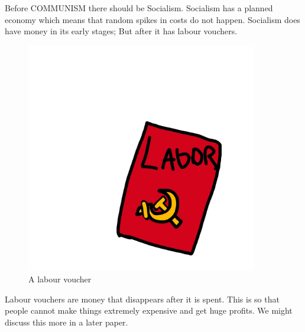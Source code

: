 \documentclass[a4paper]{book} %
\begin{document}
  Before COMMUNISM there should be Socialism. Socialism has a planned economy which means that random spikes in costs do not happen. Socialism does have money in its early stages; But after it has labour vouchers. 

\begin{figure}[tbhp]
\centering
\includegraphics[width=0.9\textwidth]{2-4.png}
\caption{A labour voucher}
\end{figure}

  Labour vouchers are money that disappears after it is spent. This is so that people cannot make things extremely expensive and get huge profits. We might discuss this more in a later paper.
\end{document}

